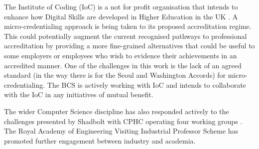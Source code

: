\documentclass[sigconf]{acmart}
\begin{document}
\begin{comment}

In addition to IET and BCS, accreditation in the broad computing area in the UK is also being performed by a few different agencies. A number of bodies are providing endorsements intended to promote employability. Tech Partnership Degrees provides endorsements to Higher Education programmes with specific curricula elements aimed at job market requirements \cite{TP2019}. Tech Partnership Degrees have a specialist scope, endorsing programmes in the area of IT Management for Business and Software Engineering for Business. For games related degrees, TIGA a trade association representing the UK's games industry and  Screenskills (formerly Creative Skillset) \cite{Screenskills2019} operate a similar role. For digital forensics The Chartered Society of Forensic Sciences \cite{CSOFS2019} provides industry related endorsements.  National Cyber Security Centre (NCSC) is a UK Government organisation tasked with enhancing the cybersecurity of the UK and accredits programmes with significant cybersecurity content \cite{NCSC2018a}. There is little published regarding the effectiveness or otherwise of these endorsements.

\end{comment}

The Institute of Coding (IoC) is a not for profit organisation that intends to enhance how Digital Skills are developed in Higher Education in the UK \cite{Davenportetal2019a}. A micro-credentialing approach is being taken to its proposed accreditation regime. This could potentially augment the current recognised pathways to professional accreditation by providing a more fine-grained alternatives that could be useful to some employers or employees who wish to evidence their achievements in an accredited manner.  One of the challenges in this work is the lack of an agreed standard (in the way there is for the Seoul and Washington Accords) for micro-credentialing. The BCS is actively working with IoC and intends to collaborate with the IoC in any initiatives of mutual benefit.

The wider Computer Science discipline has also responded actively to the challenges presented by Shadbolt with CPHC operating four working groups \cite{cphc_2016}.  The Royal Academy of Engineering Visiting Industrial Professor Scheme \cite{royal} has promoted further engagement between industry and academia.
\end{document}

